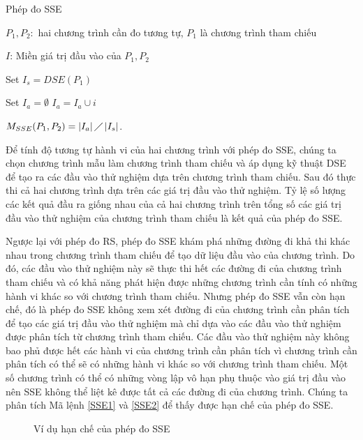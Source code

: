 \begin{algorithm}[h]
  \caption{Phép đo SSE}
  \label{alg:sse}
  \begin{algorithmic}
  \item $P_{1}, P_{2}:$ hai chương trình cần đo tương tự, $P_1$ là chương trình tham chiếu
  \item $I$: Miền giá trị đầu vào của $P_{1}, P_{2}$
  \item Set $I_{s} = DSE(P_{1})$ 
  \item Set $I_{a} = \emptyset$
     \State
    $I_{a} = I_{a} \cup i$
    \EndIf
    \EndFor
  \item
    $M_{SSE}(P_{1}, P_{2}) = \left|I_{a}\right| \diagup
    \left|I_{s}\right| $.
  \end{algorithmic}
\end{algorithm}

Để tính độ tương tự hành vi của hai chương trình với phép đo
SSE, chúng ta chọn chương trình mẫu làm chương trình tham
chiếu và áp dụng kỹ thuật DSE để tạo ra các đầu vào thử
nghiệm dựa trên chương trình tham chiếu. Sau đó thực thi cả hai chương
trình dựa trên các giá trị đầu vào thử nghiệm. Tỷ lệ số lượng các kết
quả đầu ra giống nhau của cả hai chương trình trên tổng số các giá trị
đầu vào thử nghiệm của chương trình tham chiếu là kết quả của phép đo
SSE.

Ngược lại với phép đo RS, phép đo SSE khám phá những đường đi khả thi
khác nhau trong chương trình tham chiếu để tạo dữ liệu đầu vào của
chương trình. Do đó, các đầu vào thử nghiệm này sẽ thực thi hết các
đường đi của chương trình tham chiếu và có khả năng phát hiện được
những chương trình cần tính có những hành vi khác so với chương trình
tham chiếu. Nhưng phép đo SSE vẫn còn hạn chế, đó là phép đo SSE không
xem xét đường đi của chương trình cần phân tích để tạo các giá trị đầu
vào thử nghiệm mà chỉ dựa vào các đầu vào thử nghiệm được phân tích từ
chương trình tham chiếu. Các đầu vào thử nghiệm này không bao phủ được
hết các hành vi của chương trình cần phân tích vì chương trình cần
phân tích có thể sẽ có những hành vi khác so với chương trình tham
chiếu. Một số chương trình có thể có những vòng lập vô hạn phụ thuộc
vào giá trị đầu vào nên SSE không thể liệt kê được tất cả các đường
đi của chương trình. Chúng ta phân tích Mã lệnh
\ref{SSE1} và \ref{SSE2} để thấy được hạn chế của phép đo SSE.
\begin{figure}[h]
	\centering
	\caption{Ví dụ hạn chế của phép đo SSE}
	\label{fig:hanche-SSE}
\begin{minipage}[t]{0.45\linewidth}
  
\end{minipage}%
\hfill\vrule\hfill
\begin{minipage}[t]{0.45\linewidth}
	
\end{minipage}%
\end{figure}

